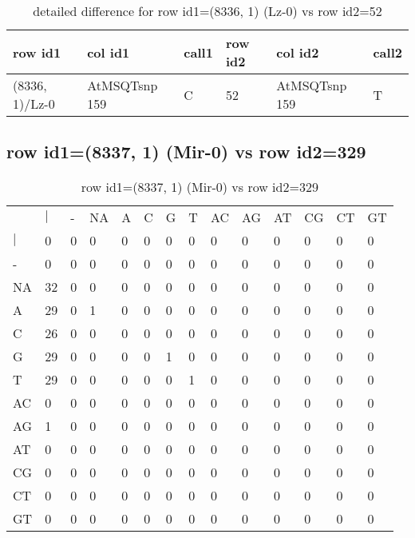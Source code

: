 \begin{center}
\begin{longtable}{|l|l|l|l|l|l|}
\caption{detailed difference for row id1=(8336, 1) (Lz-0) vs row id2=52} \label{table_dm539}\\
\hline
row id1&col id1&call1&row id2&col id2&call2\\
\hline
(8336, 1)/Lz-0&AtMSQTsnp 159&C&52&AtMSQTsnp 159&T\\
\hline
\end{longtable}
\end{center}

\subsection{row id1=(8337, 1) (Mir-0) vs row id2=329}
\begin{center}
\begin{longtable}{|l|l|l|l|l|l|l|l|l|l|l|l|l|l|}
\caption{row id1=(8337, 1) (Mir-0) vs row id2=329} \label{table_dm540}\\
\hline
\\
\hline
&$|$&-&NA&A&C&G&T&AC&AG&AT&CG&CT&GT\\
$|$&0&0&0&0&0&0&0&0&0&0&0&0&0\\
-&0&0&0&0&0&0&0&0&0&0&0&0&0\\
NA&32&0&0&0&0&0&0&0&0&0&0&0&0\\
A&29&0&1&0&0&0&0&0&0&0&0&0&0\\
C&26&0&0&0&0&0&0&0&0&0&0&0&0\\
G&29&0&0&0&0&1&0&0&0&0&0&0&0\\
T&29&0&0&0&0&0&1&0&0&0&0&0&0\\
AC&0&0&0&0&0&0&0&0&0&0&0&0&0\\
AG&1&0&0&0&0&0&0&0&0&0&0&0&0\\
AT&0&0&0&0&0&0&0&0&0&0&0&0&0\\
CG&0&0&0&0&0&0&0&0&0&0&0&0&0\\
CT&0&0&0&0&0&0&0&0&0&0&0&0&0\\
GT&0&0&0&0&0&0&0&0&0&0&0&0&0\\
\hline
\end{longtable}
\end{center}

